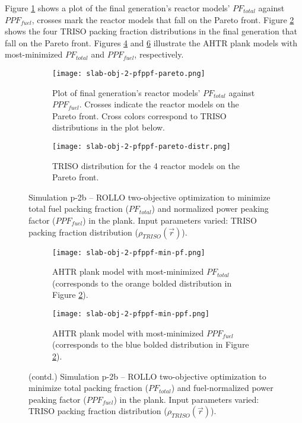Figure \ref{fig:slab-obj-2-pfppf-pareto} shows a plot of the final generation's reactor 
models' $PF_{total}$ against $PPF_{fuel}$, crosses mark the reactor models that fall on 
the Pareto front.
Figure \ref{fig:slab-obj-2-pfppf-pareto-distr} shows the four TRISO packing fraction 
distributions in the final generation that fall on the Pareto front. 
Figures \ref{fig:slab-obj-2-pfppf-min-pf} and \ref{fig:slab-obj-2-pfppf-min-ppf} 
illustrate the \gls{AHTR} plank models with most-minimized $PF_{total}$ and 
$PPF_{fuel}$, respectively. 
\begin{figure}[htbp!]
    \centering
    \begin{subfigure}{\textwidth}
        \texttt{[image: slab-obj-2-pfppf-pareto.png]}
        \caption{Plot of final generation's reactor models' $PF_{total}$ against 
        $PPF_{fuel}$. 
        Crosses indicate the reactor models on the Pareto front. Cross colors correspond  
        to TRISO distributions in the plot below.}
        \label{fig:slab-obj-2-pfppf-pareto} 
    \end{subfigure}
    \begin{subfigure}{\textwidth}
        \texttt{[image: slab-obj-2-pfppf-pareto-distr.png]}
        \caption{TRISO distribution for the 4 reactor models on the Pareto front.}
        \label{fig:slab-obj-2-pfppf-pareto-distr} 
    \end{subfigure}
    \caption{Simulation p-2b -- ROLLO two-objective optimization to minimize total fuel 
    packing fraction ($PF_{total}$) and normalized power peaking factor ($PPF_{fuel}$) 
    in the plank. 
    Input parameters varied: TRISO packing fraction distribution 
    ($\rho_{TRISO}(\vec{r})$).}
    \label{fig:slab-obj-2-pfppf}
\end{figure}
\begin{figure}[htbp!]
    \ContinuedFloat
    \begin{subfigure}{\textwidth}
        \texttt{[image: slab-obj-2-pfppf-min-pf.png]}
        \caption{\gls{AHTR} plank model with most-minimized $PF_{total}$
        (corresponds to the orange bolded distribution in Figure 
        \ref{fig:slab-obj-2-pfppf-pareto-distr}).}
        \label{fig:slab-obj-2-pfppf-min-pf} 
    \end{subfigure}
    \begin{subfigure}{\textwidth}
        \texttt{[image: slab-obj-2-pfppf-min-ppf.png]}
        \caption{\gls{AHTR} plank model with most-minimized $PPF_{fuel}$
        (corresponds to the blue bolded distribution in Figure 
        \ref{fig:slab-obj-2-pfppf-pareto-distr}).}
        \label{fig:slab-obj-2-pfppf-min-ppf} 
    \end{subfigure}
    \caption{(contd.) Simulation p-2b -- ROLLO two-objective optimization to minimize 
    total packing fraction ($PF_{total}$) and fuel-normalized power peaking factor 
    ($PPF_{fuel}$) in the plank. 
    Input parameters varied: TRISO packing fraction distribution ($\rho_{TRISO}(\vec{r})$).}
\end{figure}

